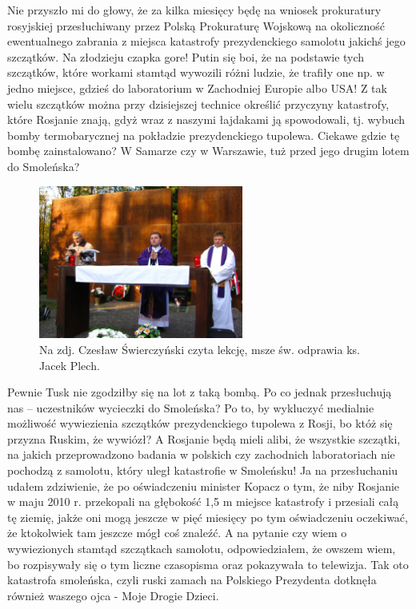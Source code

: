 Nie przyszło mi do głowy, że za kilka miesięcy będę na wniosek prokuratury rosyjskiej przesłuchiwany przez Polską Prokuraturę Wojskową na okoliczność ewentualnego zabrania z miejsca katastrofy prezydenckiego samolotu jakichś jego szczątków. Na złodzieju czapka gore! Putin się boi, że na podstawie tych szczątków, które workami stamtąd wywozili różni ludzie, że trafiły one np. w jedno miejsce, gdzieś do laboratorium w Zachodniej Europie albo USA! Z tak wielu szczątków można przy dzisiejszej technice określić przyczyny katastrofy, które Rosjanie znają, gdyż wraz z naszymi łajdakami ją spowodowali, tj. wybuch bomby termobarycznej na pokładzie prezydenckiego tupolewa. Ciekawe gdzie tę bombę zainstalowano? W Samarze czy w Warszawie, tuż przed jego drugim lotem do Smoleńska?
\begin{figure}[!h]
\begin{center}
\includegraphics[width=0.6\textwidth]{photo/czeslaw_swierczynski_katyn_1.jpg}
\caption[Katyń]{Na zdj. Czesław Świerczyński czyta lekcję, msze św. odprawia ks. Jacek Plech.}
\end{center}
\end{figure}

Pewnie Tusk nie zgodziłby się na lot z taką bombą. Po co jednak przesłuchują nas – uczestników wycieczki do Smoleńska? Po to, by wykluczyć medialnie możliwość wywiezienia szczątków prezydenckiego tupolewa z Rosji, bo któż się przyzna Ruskim, że wywiózł? A Rosjanie będą mieli alibi, że wszystkie szczątki, na jakich przeprowadzono badania w polskich czy zachodnich laboratoriach nie pochodzą z samolotu, który uległ katastrofie w Smoleńsku! Ja na przesłuchaniu udałem zdziwienie, że po oświadczeniu minister Kopacz o tym, że niby Rosjanie w maju 2010 r. przekopali na głębokość 1,5 m miejsce katastrofy i przesiali całą tę ziemię, jakże oni mogą jeszcze w pięć miesięcy po tym oświadczeniu oczekiwać, że ktokolwiek tam jeszcze mógł coś znaleźć. A na pytanie czy wiem o wywiezionych stamtąd szczątkach samolotu, odpowiedziałem, że owszem wiem, bo rozpisywały się o tym liczne czasopisma oraz pokazywała to telewizja. Tak oto katastrofa smoleńska, czyli ruski zamach na Polskiego Prezydenta dotknęła również waszego ojca - Moje Drogie Dzieci.








